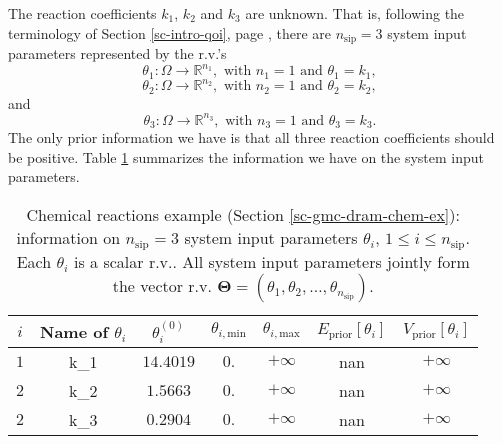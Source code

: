 The reaction coefficients $k_1$, $k_2$ and $k_3$ are unknown.
That is,
following the terminology of Section \ref{sc-intro-qoi}, page \pageref{sc-intro-qoi},
there are $n_{\text{sip}}=3$ system input parameters
represented by the r.v.'s
\begin{equation*}
\theta_1:\Omega\rightarrow\mathbb{R}^{n_1},\text{ with }n_1=1\text{ and }\theta_1=k_1,
\end{equation*}
\begin{equation*}
\theta_2:\Omega\rightarrow\mathbb{R}^{n_2},\text{ with }n_2=1\text{ and }\theta_2=k_2,
\end{equation*}
and
\begin{equation*}
\theta_3:\Omega\rightarrow\mathbb{R}^{n_3},\text{ with }n_3=1\text{ and }\theta_3=k_3.
\end{equation*}
The only prior information we have is that all three reaction coefficients should be positive.
Table \ref{tab-dram-chem-ex-sys-input-params} summarizes the information we have on the system input parameters.

\begin{table}[h!]
\begin{center}
\begin{tabular}{|c|c|c|c|c|c|c|}
\hline
 $i$      & Name of $\theta_i$ & $\theta_i^{(0)}$ & $\theta_{i,\text{min}}$ & $\theta_{i,\text{max}}$ & $E_{\text{prior}}[\theta_i]$ & $V_{\text{prior}}[\theta_i]$ \\
\hline
\hline
 $1$      & k\_1               & $14.4019$        & $0.$                    & $+\infty$               & nan           & $+\infty$     \\
\hline
 $2$      & k\_2               & $1.5663$         & $0.$                    & $+\infty$               & nan           & $+\infty$     \\
\hline
 $2$      & k\_3               & $0.2904$         & $0.$                    & $+\infty$               & nan           & $+\infty$     \\
\hline
\end{tabular}
\caption{Chemical reactions example (Section \ref{sc-gmc-dram-chem-ex}):
information on $n_{\text{sip}}=3$ system input parameters $\theta_i$, $1\leqslant i\leqslant n_{\text{sip}}$.
Each $\theta_i$ is a scalar r.v.. All system input parameters jointly form the vector r.v. $\boldsymbol{\Theta}=(\theta_1,\theta_2,\ldots,\theta_{n_{\text{sip}}})$.
}
\label{tab-dram-chem-ex-sys-input-params}
\end{center}
\end{table}

